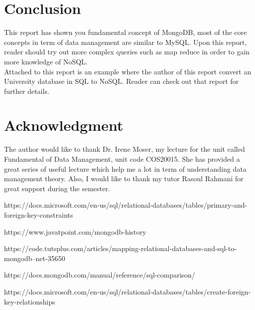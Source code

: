 \documentclass[conference]{IEEEtran}
\begin{document}
\section{Conclusion}
This report has shown you fundamental concept of MongoDB, most of the core concepts in term of data management are similar to MySQL. Upon this report, reader should try out more complex queries such as map reduce in order to gain more knowledge of NoSQL.\\
Attached to this report is an example where the author of this report convert an University database in SQL to NoSQL. Reader can check out that report for further details.

\section*{Acknowledgment}
The author would like to thank Dr. Irene Moser, my lecture for the unit called Fundamental of Data Management, unit code COS20015. She has provided a great series of useful lecture which help me a lot in term of understanding data management theory. Also, I would like to thank my tutor Rasoul Rahmani for great support during the semester.
\indent

\begin{thebibliography}{5}

https://docs.microsoft.com/en-us/sql/relational-databases/tables/primary-and-foreign-key-constraints

https://www.javatpoint.com/mongodb-history

https://code.tutsplus.com/articles/mapping-relational-databases-and-sql-to-mongodb--net-35650

https://docs.mongodb.com/manual/reference/sql-comparison/

https://docs.microsoft.com/en-us/sql/relational-databases/tables/create-foreign-key-relationships

\end{thebibliography}
\end{document}
